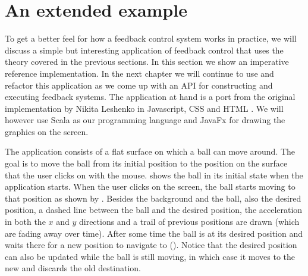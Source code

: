 \section{An extended example}
To get a better feel for how a feedback control system works in practice, we will discuss a simple but interesting application of feedback control that uses the theory covered in the previous sections. In this section we show an imperative reference implementation. In the next chapter we will continue to use and refactor this application as we come up with an API for constructing and executing feedback systems. The application at hand is a port from the original implementation by Nikita Leshenko in Javascript, CSS and HTML \cite{nikital-balltracker}. We will however use Scala as our programming language and JavaFx for drawing the graphics on the screen.

The application consists of a flat surface on which a ball can move around. The goal is to move the ball from its initial position to the position on the surface that the user clicks on with the mouse.  shows the ball in its initial state when the application starts. When the user clicks on the screen, the ball starts moving to that position as shown by . Besides the background and the ball, also the desired position, a dashed line between the ball and the desired position, the acceleration in both the $x$ and $y$ directions and a trail of previous positions are drawn (which are fading away over time). After some time the ball is at its desired position and waits there for a new position to navigate to (). Notice that the desired position can also be updated while the ball is still moving, in which case it moves to the new and discards the old destination.

